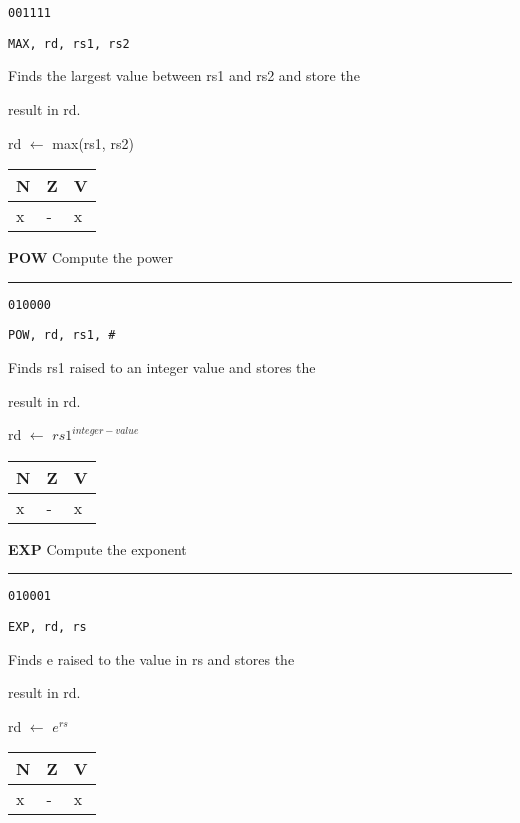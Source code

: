 \documentclass{article}
\begin{document}
{\large
	 \texttt{001111} \par
	\smallbreak
	 \texttt{MAX, rd, rs1, rs2} \par
	\smallbreak
	 Finds the largest value between rs1 and rs2 and store the \par
	\makebox[3.5cm][l]{  } result in rd. \par
	\smallbreak
	 rd $\leftarrow$ max(rs1, rs2) \par
	\smallbreak
	 \begin{tabular}{lll} N \quad & Z \quad & V \\ \hline x & - & x \\ \end{tabular}
}

\bigskip\bigskip

\flushleft
\LARGE\textbf{POW} \large \hfill Compute the power

\kern-3pt
\noindent\rule{16.5cm}{0.4pt}
\normalsize

{\large
	 \texttt{010000} \par
	\smallbreak
	 \texttt{POW, rd, rs1, \#<integer-value>} \par
	\smallbreak
	 Finds rs1 raised to an integer value and stores the \par
	\makebox[3.5cm][l]{  } result in rd. \par
	\smallbreak
	 rd $\leftarrow$ $rs1^{integer-value}$ \par
	\smallbreak
	 \begin{tabular}{lll} N \quad & Z \quad & V \\ \hline x & - & x \\ \end{tabular}
}

\bigskip\bigskip

\flushleft
\LARGE\textbf{EXP} \large \hfill Compute the exponent

\kern-3pt
\noindent\rule{16.5cm}{0.4pt}
\normalsize

{\large
	 \texttt{010001} \par
	\smallbreak
	 \texttt{EXP, rd, rs} \par
	\smallbreak
	 Finds e raised to the value in rs and stores the \par
	\makebox[3.5cm][l]{  } result in rd. \par
	\smallbreak
	 rd $\leftarrow$ $e^{rs}$ \par
	\smallbreak
	 \begin{tabular}{lll} N \quad & Z \quad & V \\ \hline x & - & x \\ \end{tabular}
}
\end{document}
